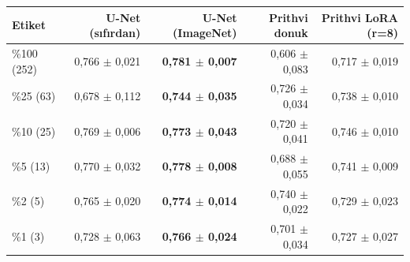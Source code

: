 \begin{tabular}{lrrrr}
\toprule
Etiket & U-Net (sıfırdan) & U-Net (ImageNet) & Prithvi donuk & Prithvi LoRA (r=8) \\
\midrule
\%100 (252) & 0,766 $\pm$ 0,021 & \textbf{0,781 $\pm$ 0,007} & 0,606 $\pm$ 0,083 & 0,717 $\pm$ 0,019 \\
\%25 (63) & 0,678 $\pm$ 0,112 & \textbf{0,744 $\pm$ 0,035} & 0,726 $\pm$ 0,034 & 0,738 $\pm$ 0,010 \\
\%10 (25) & 0,769 $\pm$ 0,006 & \textbf{0,773 $\pm$ 0,043} & 0,720 $\pm$ 0,041 & 0,746 $\pm$ 0,010 \\
\%5 (13) & 0,770 $\pm$ 0,032 & \textbf{0,778 $\pm$ 0,008} & 0,688 $\pm$ 0,055 & 0,741 $\pm$ 0,009 \\
\%2 (5) & 0,765 $\pm$ 0,020 & \textbf{0,774 $\pm$ 0,014} & 0,740 $\pm$ 0,022 & 0,729 $\pm$ 0,023 \\
\%1 (3) & 0,728 $\pm$ 0,063 & \textbf{0,766 $\pm$ 0,024} & 0,701 $\pm$ 0,034 & 0,727 $\pm$ 0,027 \\
\bottomrule
\end{tabular}
